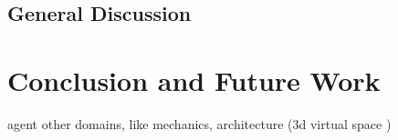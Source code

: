 \documentclass{article}
\begin{document}
\subsection{General Discussion}

\section{Conclusion and Future Work}
agent \cite{Ho2024-cd}
other domains, like mechanics, architecture (3d virtual space \cite{Sasazawa2024-wf})

\printbibliography %
\end{document}
